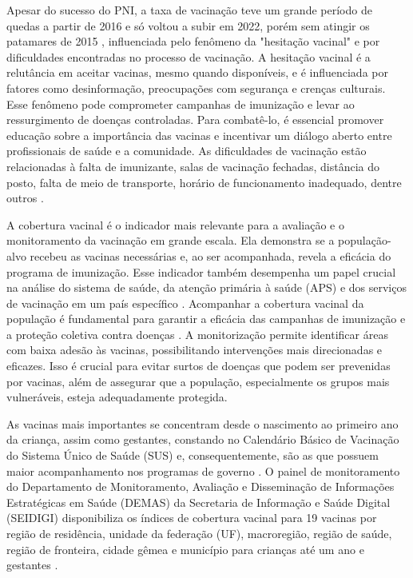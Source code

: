 \documentclass[12pt]{article}
\begin{document}
Apesar do sucesso do PNI, a taxa de vacinação teve um grande período de quedas a partir de 2016 e só voltou a subir em 2022, porém sem atingir os patamares de 2015 \cite{domingues_vacina_2019} \cite{fontanetto_reconquista_2024}, influenciada pelo fenômeno da "hesitação vacinal" e por dificuldades encontradas no processo de vacinação. A hesitação vacinal é a relutância em aceitar vacinas, mesmo quando disponíveis, e é influenciada por fatores como desinformação, preocupações com segurança e crenças culturais. Esse fenômeno pode comprometer campanhas de imunização e levar ao ressurgimento de doenças controladas. Para combatê-lo, é essencial promover educação sobre a importância das vacinas e incentivar um diálogo aberto entre profissionais de saúde e a comunidade. As dificuldades de vacinação estão relacionadas à falta de imunizante, salas de vacinação fechadas, distância do posto, falta de meio de transporte, horário de funcionamento inadequado, dentre outros \cite{barata_inquerito_2023}.

A cobertura vacinal é o indicador mais relevante para a avaliação e o monitoramento da vacinação em grande escala. Ela demonstra se a população-alvo recebeu as vacinas necessárias e, ao ser acompanhada, revela a eficácia do programa de imunização. Esse indicador também desempenha um papel crucial na análise do sistema de saúde, da atenção primária à saúde (APS) e dos serviços de vacinação em um país específico \cite{pamplona_imunizacao_2020}. Acompanhar a cobertura vacinal da população é fundamental para garantir a eficácia das campanhas de imunização e a proteção coletiva contra doenças \cite{shattock_contribution:2024}. A monitorização permite identificar áreas com baixa adesão às vacinas, possibilitando intervenções mais direcionadas e eficazes. Isso é crucial para evitar surtos de doenças que podem ser prevenidas por vacinas, além de assegurar que a população, especialmente os grupos mais vulneráveis, esteja adequadamente protegida.

As vacinas mais importantes se concentram desde o nascimento ao primeiro ano da criança, assim como gestantes, constando no Calendário Básico de Vacinação do Sistema Único de Saúde (SUS) e, consequentemente, são as que possuem maior acompanhamento nos programas de governo \cite{silva_protegendo_2024}. O painel de monitoramento do Departamento de Monitoramento, Avaliação e Disseminação de Informações Estratégicas em Saúde (DEMAS) da Secretaria de Informação e Saúde Digital (SEIDIGI) disponibiliza os índices de cobertura vacinal para 19 vacinas por região de residência, unidade da federação (UF), macroregião, região de saúde, região de fronteira, cidade gêmea e município para crianças até um ano e gestantes \cite{demas_cobertura_2024}.
\end{document}
